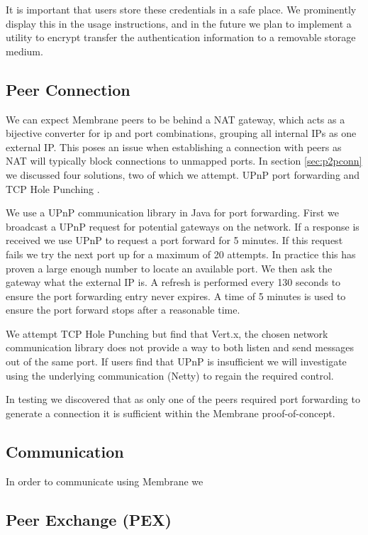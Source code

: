 \documentclass[11pt, a4paper, twocolumn, twoside]{report}
\begin{document}
It is important that users store these credentials in a safe place. We prominently display this in the usage instructions, and in the future we plan to implement a utility to encrypt transfer the authentication information to a removable storage medium.

\subsection{Peer Connection}

We can expect Membrane peers to be behind a NAT gateway, which acts as a bijective converter for ip and port combinations, grouping all internal IPs as one external IP. This poses an issue when establishing a connection with peers as NAT will typically block connections to unmapped ports. In section \ref{sec:p2pconn} we discussed four solutions, two of which we attempt. UPnP port forwarding \citep{boucadair2013universal} and TCP Hole Punching \citep{wing2010traversal}.

We use a UPnP communication library in Java for port forwarding. First we broadcast a UPnP request for potential gateways on the network. If a response is received we use UPnP to request a port forward for 5 minutes. If this request fails we try the next port up for a maximum of 20 attempts. In practice this has proven a large enough number to locate an available port. We then ask the gateway what the external IP is. A refresh is performed every 130 seconds to ensure the port forwarding entry never expires. A time of 5 minutes is used to ensure the port forward stops after a reasonable time.

We attempt TCP Hole Punching but find that Vert.x, the chosen network communication library does not provide a way to both listen and send messages out of the same port. If users find that UPnP is insufficient we will investigate using the underlying communication (Netty) to regain the required control.

In testing we discovered that as only one of the peers required port forwarding to generate a connection it is sufficient within the Membrane proof-of-concept.

\subsection{Communication}

In order to communicate using Membrane we

\subsection{Peer Exchange (PEX)}
\end{document}
